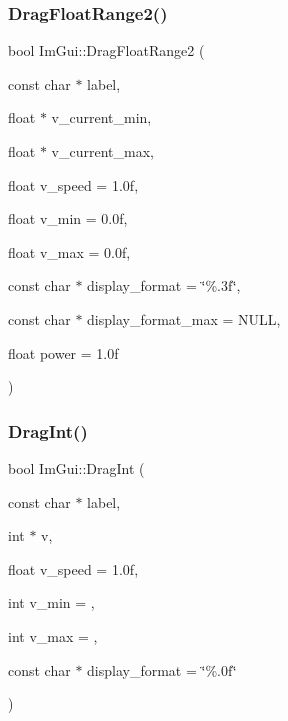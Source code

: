 \subsubsection{\texorpdfstring{Drag\+Float\+Range2()}{DragFloatRange2()}}
{\footnotesize\ttfamily bool Im\+Gui\+::\+Drag\+Float\+Range2 (\begin{DoxyParamCaption}\item[{const char $\ast$}]{label,  }\item[{float $\ast$}]{v\+\_\+current\+\_\+min,  }\item[{float $\ast$}]{v\+\_\+current\+\_\+max,  }\item[{float}]{v\+\_\+speed = {\ttfamily 1.0f},  }\item[{float}]{v\+\_\+min = {\ttfamily 0.0f},  }\item[{float}]{v\+\_\+max = {\ttfamily 0.0f},  }\item[{const char $\ast$}]{display\+\_\+format = {\ttfamily \char`\"{}\%.3f\char`\"{}},  }\item[{const char $\ast$}]{display\+\_\+format\+\_\+max = {\ttfamily NULL},  }\item[{float}]{power = {\ttfamily 1.0f} }\end{DoxyParamCaption})}

\hypertarget{namespace_im_gui_abc3ac739a79de5897b61df4e6764fc9e}{}\label{namespace_im_gui_abc3ac739a79de5897b61df4e6764fc9e} 
\subsubsection{\texorpdfstring{Drag\+Int()}{DragInt()}}
{\footnotesize\ttfamily bool Im\+Gui\+::\+Drag\+Int (\begin{DoxyParamCaption}\item[{const char $\ast$}]{label,  }\item[{int $\ast$}]{v,  }\item[{float}]{v\+\_\+speed = {\ttfamily 1.0f},  }\item[{int}]{v\+\_\+min = {},  }\item[{int}]{v\+\_\+max = {},  }\item[{const char $\ast$}]{display\+\_\+format = {\ttfamily \char`\"{}\%.0f\char`\"{}} }\end{DoxyParamCaption})}

\hypertarget{namespace_im_gui_aa74f28deeb62f0aa96e1c34b27e7bcd9}{}\label{namespace_im_gui_aa74f28deeb62f0aa96e1c34b27e7bcd9} 
